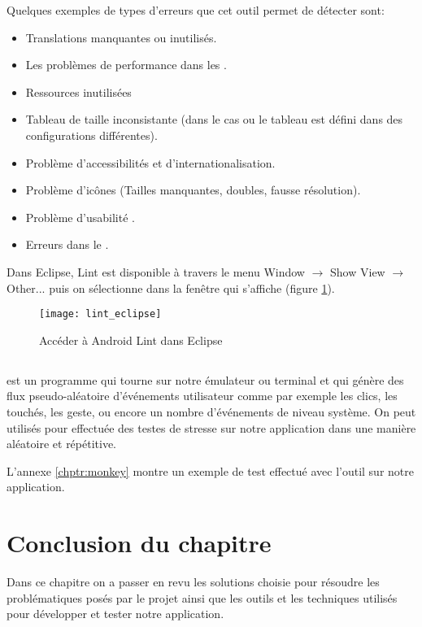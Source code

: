Quelques exemples de types d'erreurs que cet outil permet de détecter sont:

\begin{itemize}

\item Translations manquantes ou inutilisés.

\item Les problèmes de performance dans les .

\item Ressources inutilisées

\item Tableau de taille inconsistante (dans le cas ou le tableau est défini dans des configurations différentes).

\item Problème d'accessibilités et d'internationalisation.

\item Problème d'icônes (Tailles manquantes, doubles, fausse résolution).

\item Problème d'usabilité .

\item Erreurs dans le .

\end{itemize}

Dans Eclipse, \android{} Lint est disponible à travers le menu Window $\rightarrow$ Show View $\rightarrow$ Other... puis on sélectionne  dans la fenêtre qui s'affiche (figure \ref{fig:lint_eclipse}).

\begin{figure}
\center
\texttt{[image: lint\_eclipse]}
\caption{Accéder à Android Lint dans Eclipse}
\label{fig:lint_eclipse}
\end{figure}

\subsection[UI/Application Exerciser Monkey]{}

 \cite{tools:monkey} est un programme qui tourne sur notre émulateur ou terminal \android{} et qui génère des flux pseudo-aléatoire d’événements utilisateur comme par exemple les clics, les touchés, les geste, ou encore un nombre d’événements de niveau système. On peut utilisés  pour effectuée des testes de stresse sur notre application dans une manière aléatoire et répétitive.

L'annexe \ref{chptr:monkey} montre un exemple de test effectué avec l'outil  sur notre application.

\section{Conclusion du chapitre}

Dans ce chapitre on a passer en revu les solutions choisie pour résoudre les problématiques posés par le projet ainsi que les outils et les techniques utilisés pour développer et tester notre application.